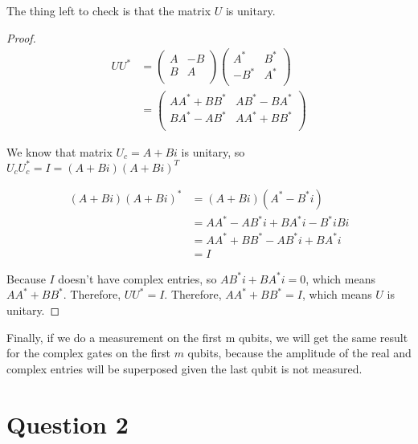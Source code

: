 \documentclass{article}
\theoremstyle{definition}
\begin{document}
The thing left to check is that the matrix $U$ is unitary.

\begin{proof}
  \begin{align*}
    U U^{*} & =
    \begin{pmatrix}
      A & -B \\
      B & A  \\
    \end{pmatrix}
    \begin{pmatrix}
      A^*  & B^* \\
      -B^* & A^* \\
    \end{pmatrix}                           \\
            & = \begin{pmatrix}
                  A A^* + B B^* & AB^* - BA^*            \\
                  BA^* - AB^*            & A A^* + BB^* \\
                \end{pmatrix}
  \end{align*}

  We know that matrix $U_c=A+Bi$ is unitary,
  so $U_c U_c^*=I=(A+Bi)(A+Bi)^T$

  \[
    \begin{aligned}
      (A+Bi)(A+Bi)^* & = (A+Bi)(A^*-B^*i)               \\
                     & = AA^* - AB^*i + BA^*i - B^*i Bi \\
                     & = AA^* + BB^* - AB^*i + BA^*i                   \\
                     & = I
    \end{aligned}
  \]

  Because $I$ doesn't have complex entries, so \(AB^*i+BA^*i=0\), which means $AA^* + BB^*$.
  Therefore, $U U^*=I$.
  Therefore, $A A^* + B B^* = I$, which means $U$ is unitary.
\end{proof}

Finally, if we do a measurement on the first m qubits, we will get the same result
for the complex gates on the first $m$ qubits, because the amplitude of the
real and complex entries will be superposed given the last qubit is not measured.

\pagebreak

\section{Question 2}
\end{document}
